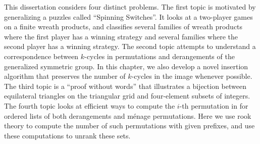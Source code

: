 This dissertation considers four distinct problems.
The first topic is motivated by generalizing a puzzles called
``Spinning Switches''. It looks at a two-player games on a finite wreath
products, and classifies several families of wreath products where
the first player has a winning strategy and several families where the
second player has a winning strategy.
The second topic attempts to understand a correspondence between
$k$-cycles in permutations and derangements of the generalized symmetric
group. In this chapter, we also develop a novel insertion algorithm that
preserves the number of $k$-cycles in the image whenever possible.
The third topic is a ``proof without words'' that illustrates a bijection
between equilateral triangles on the triangular grid and four-element subsets
of integers.
The fourth topic looks at efficient ways to compute the $i$-th permutation
in for ordered lists of both derangements and m\'enage permutations. Here
we use rook theory to compute the number of such permutations with given
prefixes, and use these computations to unrank these sets.
